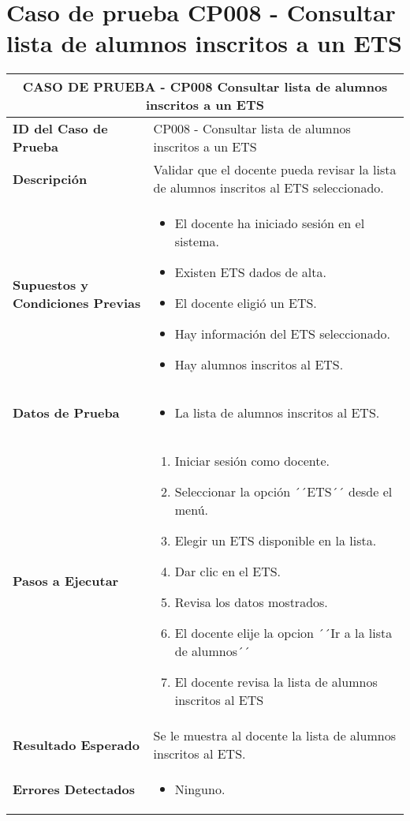 \section{Caso de prueba CP008 - Consultar lista de alumnos inscritos a un ETS}

\begin{longtable}{|p{5cm}|p{10cm}|}
	\hline
	\multicolumn{2}{|c|}{\textbf{CASO DE PRUEBA - CP008 Consultar lista de alumnos inscritos a un ETS}} \\
	\hline
	\textbf{ID del Caso de Prueba} & CP008 - Consultar lista de alumnos inscritos a un ETS \\
	\hline
	\textbf{Descripción} & Validar que el docente pueda revisar la lista de alumnos inscritos al ETS seleccionado. \\
	\hline
	\textbf{Supuestos y Condiciones Previas} & 
	\begin{itemize}
		\item El docente ha iniciado sesión en el sistema.
		\item Existen ETS dados de alta.
		\item El docente eligió un ETS.
		\item Hay información del ETS seleccionado.
		\item Hay alumnos inscritos al ETS.
		
	\end{itemize} \\
	\hline
	\textbf{Datos de Prueba} & 
	\begin{itemize}
		\item La lista de alumnos inscritos al ETS.
	\end{itemize} \\
	\hline
	\textbf{Pasos a Ejecutar} & 
	\begin{enumerate}
		\item Iniciar sesión como docente.
		\item Seleccionar la opción ´´ETS´´ desde el menú.
		\item Elegir un ETS disponible en la lista.
		\item Dar clic en el ETS.
		\item Revisa los datos mostrados.
		\item El docente elije la opcion ´´Ir a la lista de alumnos´´
		\item El docente revisa la lista de alumnos inscritos al ETS
	\end{enumerate} \\
	\hline
	\textbf{Resultado Esperado} & 
	Se le muestra al docente la lista de alumnos inscritos al ETS. \\	
	\hline
	\textbf{Errores Detectados} & 
	\begin{itemize}
		\item Ninguno.
		

\end{itemize}
\end{longtable}
